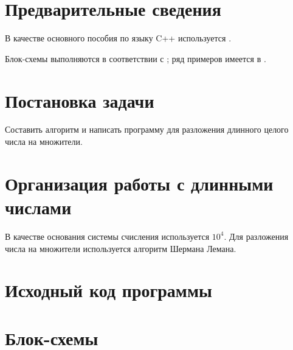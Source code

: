 \documentclass[a4paper,12pt]{article} %
\begin{document}
\setcounter{page}{2}

\section*{Предварительные сведения}

В качестве основного пособия по языку C++ используется \cite{chmyhalo}.


Блок-схемы выполняются в соответствии с \cite{gost-block-scheme};
ряд примеров имеется в \cite{wiki-block-scheme}.


\section*{Постановка задачи}
Составить алгоритм и написать программу
для разложения длинного целого числа на множители.

\section*{Организация работы с длинными числами}
В качестве основания системы счисления используется $10^4$.
Для разложения числа на множители используется алгоритм Шермана Лемана.


\section*{Исходный код программы}






\section*{Блок-схемы}
\end{document}
